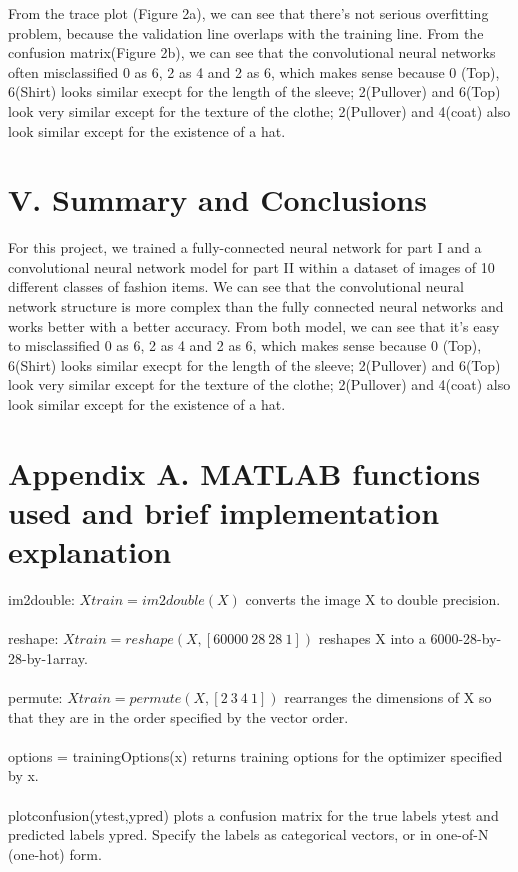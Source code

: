 \documentclass[12pt,letterpaper]{article}
\begin{document}
From the trace plot (Figure 2a), we can see that there's not serious overfitting problem, because the validation line overlaps with the training line.  From the confusion matrix(Figure 2b), we can see that the convolutional neural networks often misclassified 0 as 6, 2 as 4 and 2 as 6, which makes sense because 0 (Top), 6(Shirt) looks similar execpt for the length of the sleeve; 2(Pullover) and 6(Top) look very similar except for the texture of the clothe; 2(Pullover) and 4(coat) also look similar except for the existence of a hat. 

\section*{V. Summary and Conclusions}
For this project, we trained a fully-connected neural network for part I and a convolutional neural network model for part II within a dataset of images of 10 different classes of fashion items. We can see that the convolutional neural network structure is more complex than the fully connected neural networks and works better with a better accuracy. From both model, we can see that it's easy to misclassified 0 as 6, 2 as 4 and 2 as 6, which makes sense because 0 (Top), 6(Shirt) looks similar execpt for the length of the sleeve; 2(Pullover) and 6(Top) look very similar except for the texture of the clothe; 2(Pullover) and 4(coat) also look similar except for the existence of a hat. 

\section*{Appendix A. MATLAB functions used and brief implementation explanation}
im2double: $Xtrain = im2double(X)$ converts the image X to double precision.
\\
\\reshape: $Xtrain = reshape(X,[60000\:28\:28\:1])$ reshapes X into a 6000-28-by-28-by-1array. 
\\
\\permute: $Xtrain = permute(X,[2\:3\:4\:1])$ rearranges the dimensions of X so that they are in the order specified by the vector order.
\\
\\options = trainingOptions(x) returns training options for the optimizer specified by x. 
\\
\\plotconfusion(ytest,ypred)  plots a confusion matrix for the true labels ytest and predicted labels ypred. Specify the labels as categorical vectors, or in one-of-N (one-hot) form.
\newpage
\end{document}

